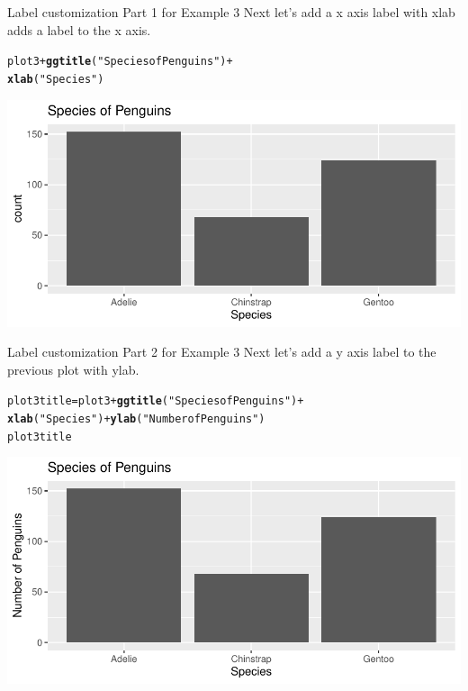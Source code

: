 \documentclass{beamer}\usepackage[]{graphicx}\usepackage[]{color}
\makeatletter
\newcommand{\hlstr}[1]{\textcolor[rgb]{0.192,0.494,0.8}{#1}}%
\newcommand{\hlopt}[1]{\textcolor[rgb]{0,0,0}{#1}}%
\newcommand{\hlstd}[1]{\textcolor[rgb]{0.345,0.345,0.345}{#1}}%
\newcommand{\hlkwb}[1]{\textcolor[rgb]{0.69,0.353,0.396}{#1}}%
\newcommand{\hlkwd}[1]{\textcolor[rgb]{0.737,0.353,0.396}{\textbf{#1}}}%
\newenvironment{kframe}{%
 \def\at@end@of@kframe{}%
 \ifinner\ifhmode%
  \def\at@end@of@kframe{\end{minipage}}%
  \begin{minipage}{\columnwidth}%
 \fi\fi%
 \def\FrameCommand##1{\hskip\@totalleftmargin \hskip-\fboxsep
 \colorbox{shadecolor}{##1}\hskip-\fboxsep
     \hskip-\linewidth \hskip-\@totalleftmargin \hskip\columnwidth}%
 \MakeFramed {\advance\hsize-\width
   \@totalleftmargin\z@ \linewidth\hsize
   \@setminipage}}%
 {\par\unskip\endMakeFramed%
 \at@end@of@kframe}
\newenvironment{knitrout}{}{} %
\makeatother
\begin{document}
\begin{frame}[fragile]{Label customization Part 1 for Example 3}
Next let's add a x axis label  with  xlab adds a label to the x axis.
\begin{knitrout}
\color{fgcolor}\begin{kframe}
\begin{alltt}
\hlstd{plot3} \hlopt{+} \hlkwd{ggtitle}\hlstd{(}\hlstr{"Species of Penguins"}\hlstd{)} \hlopt{+}
    \hlkwd{xlab}\hlstd{(}\hlstr{"Species"}\hlstd{)}
\end{alltt}
\end{kframe}
\includegraphics[width=0.95\linewidth]{figure/unnamed-chunk-11-1} 
\end{knitrout}
\end{frame}
\begin{frame}[fragile]{Label customization Part 2 for Example 3}
Next let's add a y axis label to the previous plot with ylab.
\begin{knitrout}
\color{fgcolor}\begin{kframe}
\begin{alltt}
\hlstd{plot3title} \hlkwb{=} \hlstd{plot3} \hlopt{+} \hlkwd{ggtitle}\hlstd{(}\hlstr{"Species of Penguins"}\hlstd{)} \hlopt{+}
    \hlkwd{xlab}\hlstd{(}\hlstr{"Species"}\hlstd{)} \hlopt{+} \hlkwd{ylab}\hlstd{(}\hlstr{"Number of Penguins"}\hlstd{)}
\hlstd{plot3title}
\end{alltt}
\end{kframe}
\includegraphics[width=0.95\linewidth]{figure/unnamed-chunk-12-1} 
\end{knitrout}
\end{frame}
\end{document}
